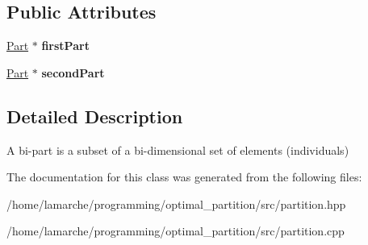 \subsection*{Public Attributes}
\begin{DoxyCompactItemize}
\item 
\hypertarget{classBiPart_a5846464cf88602318aa6c4f26976255b}{\hyperlink{classPart}{Part} $\ast$ {\bfseries first\-Part}}\label{classBiPart_a5846464cf88602318aa6c4f26976255b}

\item 
\hypertarget{classBiPart_a3497ede9e6226b6b71b39e481d07c63e}{\hyperlink{classPart}{Part} $\ast$ {\bfseries second\-Part}}\label{classBiPart_a3497ede9e6226b6b71b39e481d07c63e}

\end{DoxyCompactItemize}


\subsection{Detailed Description}
A bi-\/part is a subset of a bi-\/dimensional set of elements (individuals) 

The documentation for this class was generated from the following files\-:\begin{DoxyCompactItemize}
\item 
/home/lamarche/programming/optimal\-\_\-partition/src/partition.\-hpp\item 
/home/lamarche/programming/optimal\-\_\-partition/src/partition.\-cpp\end{DoxyCompactItemize}
